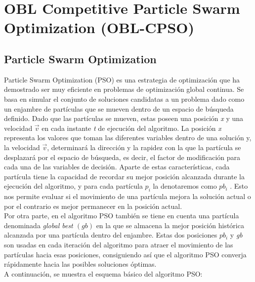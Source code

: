

\clearpage

\section{OBL Competitive Particle Swarm Optimization (OBL-CPSO)}
\label{sec:OBL-CPSO}
\subsection{Particle Swarm Optimization}
Particle Swarm Optimization (PSO) \cite{metabook, comparison, PSO_KA, GPSO} es una estrategia de optimización que ha demostrado ser muy eficiente en problemas de optimización global continua. Se basa en simular el conjunto de soluciones candidatas a un problema dado como un enjambre de partículas que se mueven dentro de un espacio de búsqueda definido. Dado que las partículas se mueven, estas poseen una posición \textit{x} y una velocidad $\overrightarrow{v}$ en cada instante \textit{t} de ejecución del algoritmo. La posición \textit{x} representa los valores que toman las diferentes variables dentro de una solución y, la velocidad $\overrightarrow{v}$, determinará la dirección y la rapidez con la que la partícula se desplazará por el espacio de búsqueda, es decir, el factor de modificación para cada una de las variables de decisión. Aparte de estas características, cada partícula tiene la capacidad de recordar su mejor posición alcanzada durante la ejecución del algoritmo, y para cada partícula $p_{i}$ la denotaremos como $pb_{i}$ \cite{metabook}. Esto nos permite evaluar si el movimiento de una partícula mejora la solución actual o por el contrario es mejor permanecer en la posición actual. \\

Por otra parte, en el algoritmo PSO también se tiene en cuenta una partícula denominada \textit{global best $(gb)$} en la que se almacena la mejor posición histórica alcanzada por una partícula dentro del enjambre. Estas dos posiciones $pb_{i}$ y \textit{gb} son usadas en cada iteración del algoritmo para atraer el movimiento de las partículas hacia esas posiciones, consiguiendo así que el algoritmo PSO converja rápidamente hacia las posibles soluciones óptimas. \\
A continuación, se muestra el esquema básico del algoritmo PSO: 

\newpage

